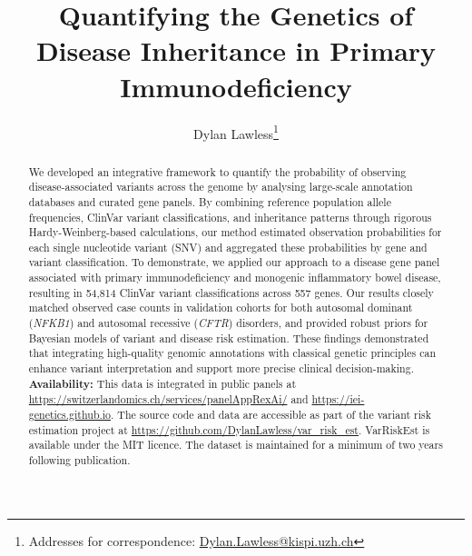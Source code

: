 
\usepackage[printonlyused,withpage,nohyperlinks]{acronym}
\usepackage{tikz}
\usetikzlibrary{calc}
\usepackage{amsmath, amssymb}


\title{Quantifying the Genetics of Disease Inheritance in Primary Immunodeficiency}

\author[1]{Dylan Lawless\thanks{Addresses for correspondence: \href{mailto:Dylan.Lawless@kispi.uzh.ch}{Dylan.Lawless@kispi.uzh.ch}}}

\maketitle
\justify

\begin{abstract}
We developed an integrative framework to quantify the probability of observing disease-associated variants across the genome by analysing large-scale annotation databases and curated gene panels. By combining reference population allele frequencies, ClinVar variant classifications, and inheritance patterns through rigorous Hardy-Weinberg-based calculations, our method estimated observation probabilities for each single nucleotide variant (SNV) and aggregated these probabilities by gene and variant classification. To demonstrate, we applied our approach to a disease gene panel  associated with primary immunodeficiency and monogenic inflammatory bowel disease, resulting in 54,814 ClinVar variant classifications across 557 genes. Our results closely matched observed case counts in validation cohorts for both autosomal dominant (\textit{NFKB1}) and autosomal recessive (\textit{CFTR}) disorders, and provided robust priors for Bayesian models of variant and disease risk estimation. These findings demonstrated that integrating high-quality genomic annotations with classical genetic principles can enhance variant interpretation and support more precise clinical decision-making.
\\[1ex]
\noindent \textbf{Availability:} This data is integrated in public panels at  \url{https://switzerlandomics.ch/services/panelAppRexAi/} and 
\url{https://iei-genetics.github.io}.
The source code and data are accessible as part of the variant risk estimation project at \url{https://github.com/DylanLawless/var_risk_est}. VarRiskEst is available under the MIT licence. 
The dataset is maintained for a minimum of two years following publication.
\end{abstract}
\clearpage

